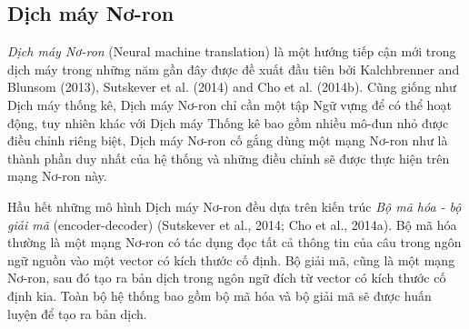 
\subsection{Dịch máy Nơ-ron}

\textit{Dịch máy Nơ-ron} (Neural machine translation) là một hướng tiếp cận mới trong dịch máy trong những năm gần đây được đề xuất đầu tiên bởi Kalchbrenner and Blunsom (2013), Sutskever et al. (2014) and Cho et al. (2014b). Cũng giống như Dịch máy thống kê, Dịch máy Nơ-ron chỉ cần một tập Ngữ vựng để có thể hoạt động, tuy nhiên khác với Dịch máy Thống kê bao gồm nhiều mô-đun nhỏ được điều chỉnh riêng biệt, Dịch máy Nơ-ron cố gắng dùng một mạng Nơ-ron như là thành phần duy nhất của hệ thống và những điều chỉnh sẽ được thực hiện trên mạng Nơ-ron này. 

Hầu hết những mô hình Dịch máy Nơ-ron đều dựa trên kiến trúc \textit{Bộ mã hóa - bộ giải mã} (encoder-decoder) (Sutskever et al., 2014; Cho et al., 2014a). Bộ mã hóa thường là một mạng Nơ-ron có tác dụng đọc tất cả thông tin của câu trong ngôn ngữ nguồn vào một vector có kích thước cố định. Bộ giải mã, cũng là một mạng Nơ-ron, sau đó tạo ra bản dịch trong ngôn ngữ đích từ vector có kích thước cố định kia. Toàn bộ hệ thống bao gồm bộ mã hóa và bộ giải mã sẽ được huấn luyện để tạo ra bản dịch. \\\\

